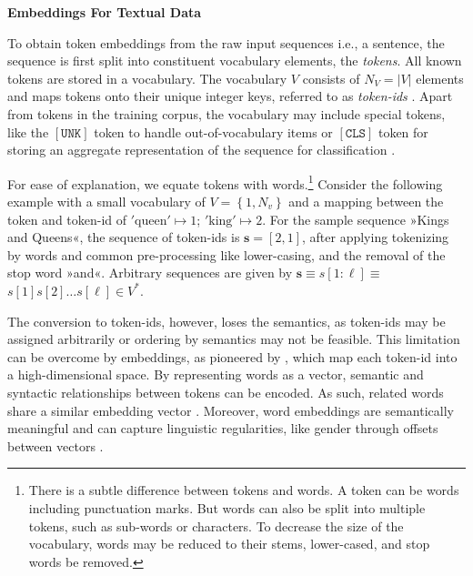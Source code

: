\textbf{Embeddings For Textual Data}

To obtain \gls{token} embeddings from the raw input sequences i.e., a sentence, the sequence is first split into constituent vocabulary elements, the \emph{tokens}. All known \glspl{token} are stored in a vocabulary. The vocabulary $V$ consists of $N_{V}=|V|$ elements and maps \glspl{token} onto their unique integer keys, referred to as \emph{token-ids} \autocite[][3]{phuongFormalAlgorithmsTransformers2022}. Apart from \glspl{token} in the training corpus, the vocabulary may include special \glspl{token}, like the $\mathtt{[UNK]}$ \gls{token} to handle out-of-vocabulary items or $\mathtt{[CLS]}$ \gls{token} for storing an aggregate representation of the sequence for classification \autocite[cp.][4]{devlinBERTPretrainingDeep2019}.

For ease of explanation, we equate \glspl{token} with words.\footnote{There is a subtle difference between \glspl{token} and words. A \gls{token} can be words including punctuation marks. But words can also be split into multiple \glspl{token}, such as sub-words \autocite[][3]{bojanowskiEnrichingWordVectors2017} or characters. To decrease the size of the vocabulary, words may be reduced to their stems, lower-cased, and stop words be removed.} Consider the following example with a small vocabulary of $V=\left\{1, N_v\right\}$ and a mapping between the \gls{token} and token-id of $\mathrm{'queen'}\mapsto 1$; $\mathrm{'king'}\mapsto 2$. For the sample sequence »Kings and Queens«, the sequence of token-ids is $\mathbf{s}=[2, 1]$, after applying tokenizing by words and common pre-processing like lower-casing, and the removal of the stop word »and«. Arbitrary sequences are given by $\mathbf{s} \equiv s[1: \ell] \equiv$ $s[1] s[2] \ldots s[\ell] \in V^*$.

The conversion to token-ids, however, loses the semantics, as token-ids may be assigned arbitrarily or ordering by semantics may not be feasible. This limitation can be overcome by embeddings, as pioneered by \textcite[][1139]{bengioNeuralProbabilisticLanguage}, which map each token-id into a high-dimensional space. By representing words as a vector, semantic and syntactic relationships between tokens can be encoded. As such, related words share a similar embedding vector \autocite[][1139]{bengioNeuralProbabilisticLanguage}. Moreover, word embeddings are semantically meaningful and can capture linguistic regularities, like gender through offsets between vectors \autocite[][748--749]{mikolovLinguisticRegularitiesContinuous2013}.

